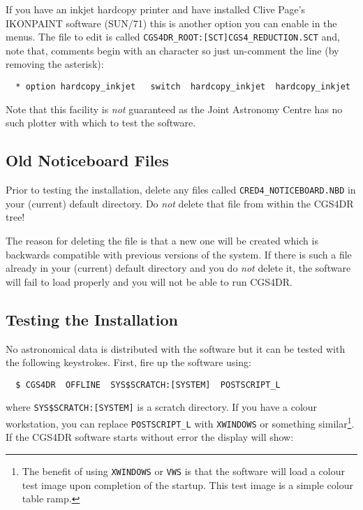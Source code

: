 If you have an inkjet hardcopy printer and have installed Clive Page's
IKONPAINT software (SUN/71) this is another option you can enable in the
menus. The file to edit is called {\tt CGS4DR\_ROOT:[SCT]CGS4\_REDUCTION.SCT}
and, note that, comments begin with an {\tt *} character so just un-comment
the line (by removing the asterisk):

\begin{verbatim}
  * option hardcopy_inkjet   switch  hardcopy_inkjet  hardcopy_inkjet
\end{verbatim}

Note that this facility is {\em not} guaranteed as the Joint Astronomy Centre
has no such plotter with which to test the software.

\subsection{Old Noticeboard Files}

Prior to testing the installation, delete any files called
{\tt CRED4\_NOTICEBOARD.NBD} in your (current) default directory.
Do {\em not} delete that file from within the CGS4DR tree!

The reason for deleting the file is that a new one will be created which
is backwards compatible with previous versions of the system. If there is
such a file already in your (current) default directory and you do {\em not}
delete it, the software will fail
to load properly and you will not be able to run CGS4DR.

\subsection{Testing the Installation}

No astronomical data is distributed with the software but it can be tested
with the following keystrokes. First, fire up the software using:

\begin{verbatim}
  $ CGS4DR  OFFLINE  SYS$SCRATCH:[SYSTEM]  POSTSCRIPT_L
\end{verbatim}

where {\tt SYS\$SCRATCH:[SYSTEM]} is a scratch directory. If you have a colour
workstation, you can replace {\tt POSTSCRIPT\_L} with {\tt XWINDOWS} or
something similar\footnote{The benefit of using {\tt XWINDOWS} or {\tt VWS}
is that the software will load a colour test image upon completion of the
startup. This test image is a simple colour table ramp.}.
If the CGS4DR software starts without error the display will show:

